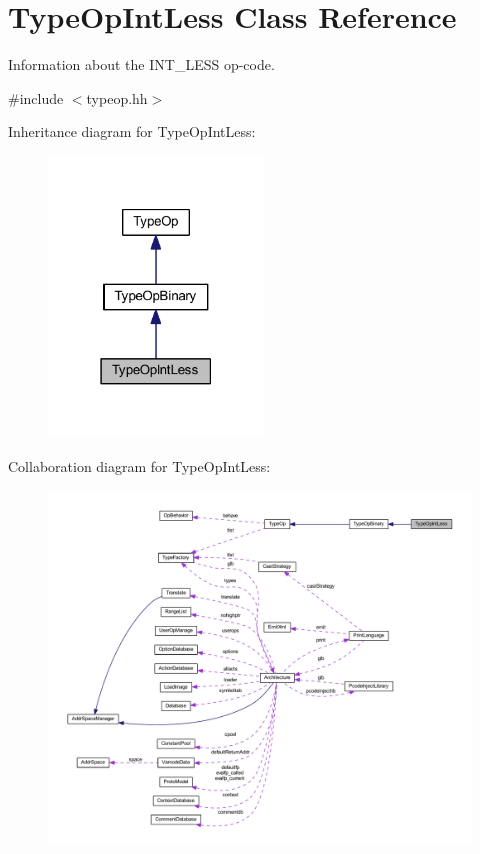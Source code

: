 \hypertarget{class_type_op_int_less}{}\section{Type\+Op\+Int\+Less Class Reference}
\label{class_type_op_int_less}


Information about the I\+N\+T\+\_\+\+L\+E\+SS op-\/code.  




{\ttfamily \#include $<$typeop.\+hh$>$}



Inheritance diagram for Type\+Op\+Int\+Less\+:
\nopagebreak
\begin{figure}[H]
\begin{center}
\leavevmode
\includegraphics[width=162pt]{class_type_op_int_less__inherit__graph}
\end{center}
\end{figure}


Collaboration diagram for Type\+Op\+Int\+Less\+:
\nopagebreak
\begin{figure}[H]
\begin{center}
\leavevmode
\includegraphics[width=350pt]{class_type_op_int_less__coll__graph}
\end{center}
\end{figure}
